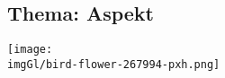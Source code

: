 
\subsection{Thema: Aspekt}

\begin{center}
  \texttt{[image: \\imgGl/bird-flower-267994-pxh.png]}
\end{center}


